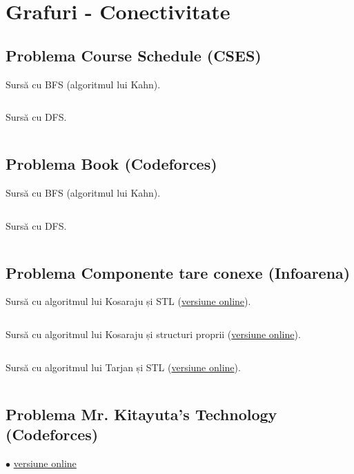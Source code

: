 \documentclass[../main.tex]{subfiles}
\begin{document}
\chapter{Grafuri - Conectivitate}

\section{Problema Course Schedule (CSES)}
\label{code:course-schedule}

Sursă cu BFS (algoritmul lui Kahn).

\inputminted{cpp}{../src/graphs/course-schedule-bfs.cpp}

Sursă cu DFS.

\inputminted{cpp}{../src/graphs/course-schedule-dfs.cpp}

\section{Problema Book (Codeforces)}
\label{code:book}

Sursă cu BFS (algoritmul lui Kahn).

\inputminted{cpp}{../src/graphs/book-bfs.cpp}

Sursă cu DFS.

\inputminted{cpp}{../src/graphs/book-dfs.cpp}

\section{Problema Componente tare conexe (Infoarena)}
\label{code:ctc}

Sursă cu algoritmul lui Kosaraju și STL (\href{https://infoarena.ro/job_detail/3200026?action=view-source}{versiune online}).

\inputminted{cpp}{../src/graphs/scc-kosaraju-stl.cpp}

Sursă cu algoritmul lui Kosaraju și structuri proprii (\href{https://infoarena.ro/job_detail/3200024?action=view-source}{versiune online}).

\inputminted{cpp}{../src/graphs/scc-kosaraju.cpp}

Sursă cu algoritmul lui Tarjan și STL (\href{https://www.infoarena.ro/job_detail/3200244?action=view-source}{versiune online}).

\inputminted{cpp}{../src/graphs/scc-tarjan-stl.cpp}

\section{Problema Mr. Kitayuta's Technology (Codeforces)}
\label{code:mr-kitayuta-s-technology}
$\bullet$
\href{https://codeforces.com/contest/505/submission/362611690}{versiune online}
\end{document}
